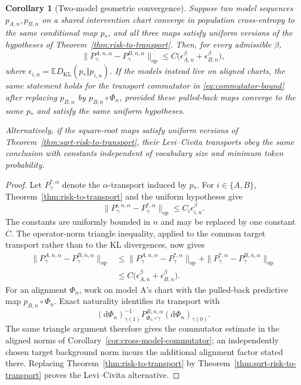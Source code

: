 \documentclass[11pt]{article}
\newtheorem{corollary}[theorem]{Corollary}
\theoremstyle{definition}
\theoremstyle{remark}
\newcommand{\E}{\mathbb{E}}
\newcommand{\KL}{D_{\mathrm{KL}}}
\newcommand{\op}{\mathrm{op}}
\newcommand{\dd}{\mathrm{d}}
\begin{document}
\begin{corollary}[Two-model geometric convergence]\label{cor:two-model-convergence}
Suppose two model sequences $p_{A,n},p_{B,n}$ on a shared intervention chart converge in population cross-entropy to the same conditional map $p_*$, and all three maps satisfy uniform versions of the hypotheses of Theorem~\ref{thm:risk-to-transport}. Then, for every admissible $\beta$,
\begin{equation}
    \|P_\gamma^{A,n,\alpha}-P_\gamma^{B,n,\alpha}\|_{\op}
    \le C\bigl(\epsilon_{A,n}^{\beta}+\epsilon_{B,n}^{\beta}\bigr),
\end{equation}
where $\epsilon_{i,n}=\E\KL(p_*\Vert p_{i,n})$. If the models instead live on aligned charts, the same statement holds for the transport commutator in \eqref{eq:commutator-bound} after replacing $p_{B,n}$ by $p_{B,n}\circ\Phi_n$, provided these pulled-back maps converge to the same $p_*$ and satisfy the same uniform hypotheses.

Alternatively, if the square-root maps satisfy uniform versions of Theorem~\ref{thm:sqrt-risk-to-transport}, their Levi--Civita transports obey the same conclusion with constants independent of vocabulary size and minimum token probability.
\end{corollary}

\begin{proof}
Let $P_\gamma^{*,\alpha}$ denote the $\alpha$-transport induced by $p_*$. For $i\in\{A,B\}$, Theorem~\ref{thm:risk-to-transport} and the uniform hypotheses give
\begin{equation}
    \|P_\gamma^{i,n,\alpha}-P_\gamma^{*,\alpha}\|_{\op}
    \le C_i\epsilon_{i,n}^{\beta}.
\end{equation}
The constants are uniformly bounded in $n$ and may be replaced by one constant $C$. The operator-norm triangle inequality, applied to the common target transport rather than to the KL divergences, now gives
\begin{equation}
\begin{split}
    \|P_\gamma^{A,n,\alpha}-P_\gamma^{B,n,\alpha}\|_{\op}
    &\le
    \|P_\gamma^{A,n,\alpha}-P_\gamma^{*,\alpha}\|_{\op}
    +\|P_\gamma^{*,\alpha}-P_\gamma^{B,n,\alpha}\|_{\op}\\
    &\le C\bigl(\epsilon_{A,n}^{\beta}+\epsilon_{B,n}^{\beta}\bigr).
\end{split}
\end{equation}
For an alignment $\Phi_n$, work on model A's chart with the pulled-back predictive map $p_{B,n}\circ\Phi_n$. Exact naturality identifies its transport with
\begin{equation}
    (\dd\Phi_n)_{\gamma(1)}^{-1}
    P_{\Phi_n\circ\gamma}^{B,n,\alpha}
    (\dd\Phi_n)_{\gamma(0)}.
\end{equation}
The same triangle argument therefore gives the commutator estimate in the aligned norms of Corollary~\ref{cor:cross-model-commutator}; an independently chosen target background norm incurs the additional alignment factor stated there. Replacing Theorem~\ref{thm:risk-to-transport} by Theorem~\ref{thm:sqrt-risk-to-transport} proves the Levi--Civita alternative.
\end{proof}
\end{document}
